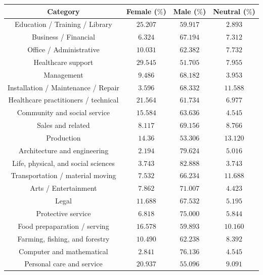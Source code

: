 \documentclass[fleqn,10pt]{article}
\begin{document}
\begin{table}[H]
\small{
	\centering
	\begin{tabular}{|c|c|c|c|}
	\hline
	Category 								& Female ($\%$)	& Male ($\%$)	& Neutral ($\%$) \\ \hline
	\hline		
	Education / Training / Library 			& $25.207$ 		& $59.917$		& $2.893$		\\ \hline
	Business / Financial 					& $6.324$ 		& $67.194$		& $7.312$		\\ \hline
	Office / Administrative					& $10.031$		& $62.382$		& $7.732$		\\ \hline
	Healthcare support						& $29.545$		& $51.705$		& $7.955$		\\ \hline
	Management								& $9.486$		& $68.182$		& $3.953$		\\ \hline
	Installation / Maintenance / Repair		& $3.596$		& $68.332$		& $11.588$		\\ \hline
	Healthcare practitioners / technical	& $21.564$		& $61.734$		& $6.977$		\\ \hline
	Community and social service			& $15.584$ 		& $63.636$		& $4.545$		\\ \hline
	Sales and related						& $8.117$ 		& $69.156$		& $8.766$		\\ \hline
	Production								& $14.36$ 		& $53.306$		& $13.120$		\\ \hline
	Architecture and engineering			& $2.194$		& $79.624$		& $5.016$		\\ \hline
	Life, physical, and social sciences		& $3.743$ 		& $82.888$		& $3.743$		\\ \hline
	Transportation / material moving		& $7.532$ 		& $66.234$		& $11.688$		\\ \hline
	Arts / Entertainment					& $7.862$ 		& $71.007$		& $4.423$		\\ \hline
	Legal									& $11.688$ 		& $67.532$		& $5.195$		\\ \hline
	Protective service						& $6.818$ 		& $75.000$		& $5.844$		\\ \hline
	Food prepaparation / serving			& $16.578$ 		& $59.893$		& $10.160$		\\ \hline
	Farming, fishing, and forestry			& $10.490$ 		& $62.238$		& $8.392$		\\ \hline
	Computer and mathematical				& $2.841$ 		& $76.136$		& $4.545$		\\ \hline
	Personal care and service				& $20.937$ 		& $55.096$		& $9.091$		\\ \hline

\end{tabular}}
\end{table}
\end{document}
